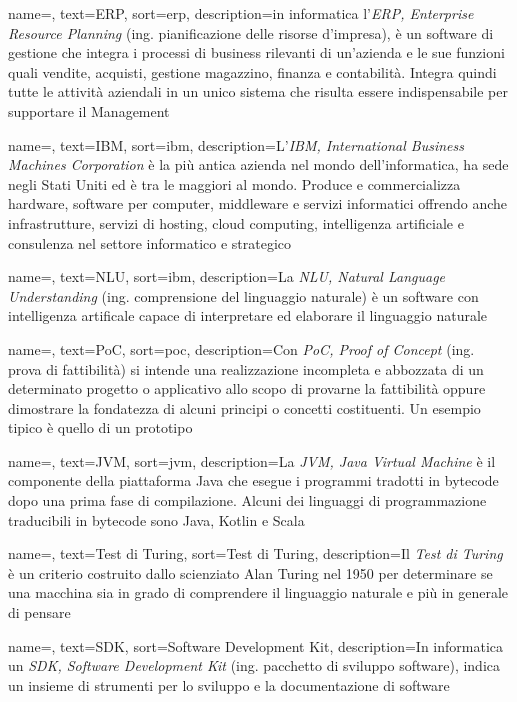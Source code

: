 {
    name=,
    text=ERP,
    sort=erp,
    description={in informatica l'\emph{ERP, Enterprise Resource Planning} (ing. pianificazione delle risorse d'impresa), è un software di gestione che integra i processi di business rilevanti di un'azienda e le sue funzioni quali vendite, acquisti, gestione magazzino, finanza e contabilità. Integra quindi tutte le attività aziendali in un unico sistema che risulta essere indispensabile per supportare il Management}
}

{
	name=,
	text=IBM,
	sort=ibm,
	description={L'\emph{IBM, International Business Machines Corporation} è la più antica azienda nel mondo dell'informatica, ha sede negli Stati Uniti ed è tra le maggiori al mondo. Produce e commercializza hardware, software per computer, middleware e servizi informatici offrendo anche infrastrutture, servizi di hosting, cloud computing, intelligenza artificiale e consulenza nel settore informatico e strategico}
}

{
	name=,
	text=NLU,
	sort=ibm,
	description={La \emph{NLU, Natural Language Understanding} (ing. comprensione del linguaggio naturale) è un software con intelligenza artificale capace di interpretare ed elaborare il linguaggio naturale}
}

{
	name=,
	text=PoC,
	sort=poc,
	description={Con \emph{PoC, Proof of Concept} (ing. prova di fattibilità) si intende una realizzazione incompleta e abbozzata di un determinato progetto o applicativo allo scopo di provarne la fattibilità oppure dimostrare la fondatezza di alcuni principi o concetti costituenti. Un esempio tipico è quello di un prototipo}
}

{
	name=,
	text=JVM,
	sort=jvm,
	description={La \emph{JVM, Java Virtual Machine} è il componente della piattaforma Java che esegue i programmi tradotti in bytecode dopo una prima fase di compilazione. Alcuni dei linguaggi di programmazione traducibili in bytecode sono Java, Kotlin e Scala}
}

{
	name=,
	text=Test di Turing,
	sort=Test di Turing,
	description={Il \emph{Test di Turing} è un criterio costruito dallo scienziato Alan Turing nel 1950 per determinare se una macchina sia in grado di comprendere il linguaggio naturale e più in generale di pensare}
}

{
	name=,
	text=SDK,
	sort=Software Development Kit,
	description={In informatica un \emph{SDK, Software Development Kit} (ing. pacchetto di sviluppo software), indica un insieme di strumenti per lo sviluppo e la documentazione di software}
}

